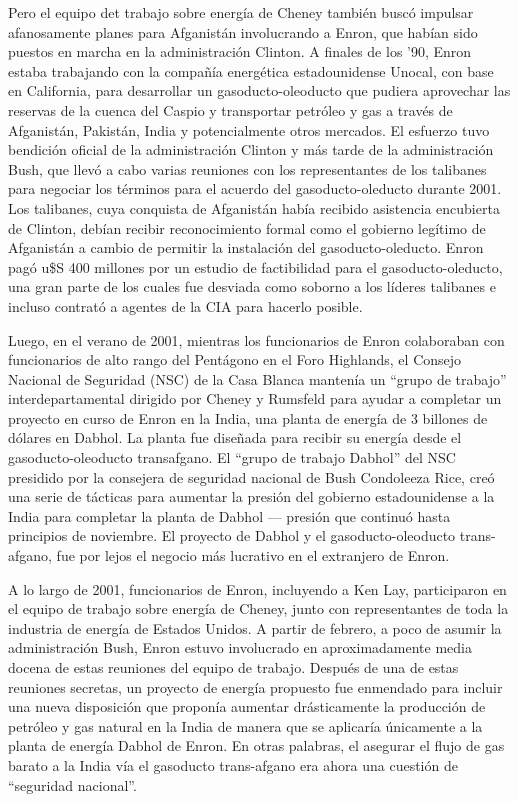 \documentclass[10pt,a5paper,twoside,spanish,]{book}
\begin{document}
Pero el equipo det trabajo sobre energía de Cheney también buscó
impulsar afanosamente planes para Afganistán involucrando a Enron, que
habían sido puestos en marcha en la administración Clinton. A finales de
los '90, Enron estaba trabajando con la compañía energética
estadounidense Unocal, con base en California, para desarrollar un
gasoducto-oleoducto que pudiera aprovechar las reservas de la cuenca del
Caspio y transportar petróleo y gas a través de Afganistán, Pakistán,
India y potencialmente otros mercados. El esfuerzo tuvo bendición
oficial de la administración Clinton y más tarde de la administración
Bush, que llevó a cabo varias reuniones con los representantes de los
talibanes para negociar los términos para el acuerdo del
gasoducto-oleducto durante 2001. Los talibanes, cuya conquista de
Afganistán había recibido asistencia encubierta de Clinton, debían
recibir reconocimiento formal como el gobierno legítimo de Afganistán a
cambio de permitir la instalación del gasoducto-oleducto. Enron pagó
u\$S 400 millones por un estudio de factibilidad para el
gasoducto-oleducto, una gran parte de los cuales fue desviada como
soborno a los líderes talibanes e incluso contrató a agentes de la CIA
para hacerlo posible.

Luego, en el verano de 2001, mientras los funcionarios de Enron
colaboraban con funcionarios de alto rango del Pentágono en el Foro
Highlands, el Consejo Nacional de Seguridad (NSC) de la Casa Blanca
mantenía un ``grupo de trabajo'' interdepartamental dirigido por Cheney
y Rumsfeld para ayudar a completar un proyecto en curso de Enron en la
India, una planta de energía de 3 billones de dólares en Dabhol. La
planta fue diseñada para recibir su energía desde el gasoducto-oleoducto
transafgano. El ``grupo de trabajo Dabhol'' del NSC presidido por la
consejera de seguridad nacional de Bush Condoleeza Rice, creó una serie
de tácticas para aumentar la presión del gobierno estadounidense a la
India para completar la planta de Dabhol --- presión que continuó hasta
principios de noviembre. El proyecto de Dabhol y el gasoducto-oleoducto
trans-afgano, fue por lejos el negocio más lucrativo en el extranjero de
Enron.

A lo largo de 2001, funcionarios de Enron, incluyendo a Ken Lay,
participaron en el equipo de trabajo sobre energía de Cheney, junto con
representantes de toda la industria de energía de Estados Unidos. A
partir de febrero, a poco de asumir la administración Bush, Enron estuvo
involucrado en aproximadamente media docena de estas reuniones del
equipo de trabajo. Después de una de estas reuniones secretas, un
proyecto de energía propuesto fue enmendado para incluir una nueva
disposición que proponía aumentar drásticamente la producción de
petróleo y gas natural en la India de manera que se aplicaría únicamente
a la planta de energía Dabhol de Enron. En otras palabras, el asegurar
el flujo de gas barato a la India vía el gasoducto trans-afgano era
ahora una cuestión de ``seguridad nacional''.
\end{document}
